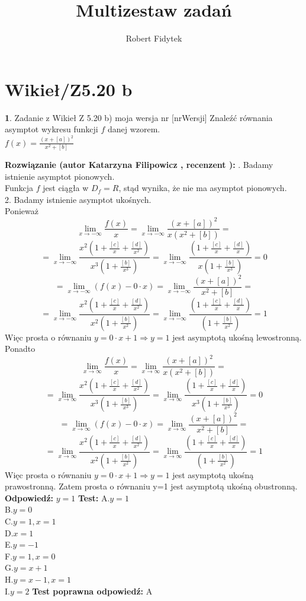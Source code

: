 \documentclass[12pt, a4paper]{article}
\title{Multizestaw zadań}
\author{Robert Fidytek}
\date{}
\theoremstyle{definition} %
\newtheorem{zad}{}
\newcommand{\kategoria}[1]{\section{#1}} %
\newcommand{\zadStart}[1]{\begin{zad}#1\newline} %
\newcommand{\zadStop}{\end{zad}}   %
\newcommand{\rozwStart}[2]{\noindent \textbf{Rozwiązanie (autor #1 , recenzent #2): }\newline} %
\newcommand{\rozwStop}{\newline}                                            %
\newcommand{\odpStart}{\noindent \textbf{Odpowiedź:}\newline}    %
\newcommand{\odpStop}{\newline}                                             %
\newcommand{\testStart}{\noindent \textbf{Test:}\newline} %
\newcommand{\testStop}{\newline} %
\newcommand{\kluczStart}{\noindent \textbf{Test poprawna odpowiedź:}\newline} %
\newcommand{\kluczStop}{\newline} %
\begin{document}
\maketitle


\kategoria{Wikieł/Z5.20 b}
\zadStart{Zadanie z Wikieł Z 5.20 b) moja wersja nr [nrWersji]}
Znaleźć równania asymptot wykresu funkcji $f$ danej wzorem.\\
 $f(x)=\frac{(x+[a])^2}{x^2+[b]}$
\zadStop
\rozwStart{Katarzyna Filipowicz}{}
1. Badamy istnienie asymptot pionowych.\\
Funkcja $f$ jest ciągła w $D_f=R$, stąd wynika, że nie ma asymptot pionowych.\\
2. Badamy istnienie asymptot ukośnych.\\
Ponieważ
$$ 
\lim_{x\rightarrow-\infty} \frac{f(x)}{x}=\lim_{x\rightarrow-\infty}\frac{(x+[a])^2}{x(x^2+[b])}=
$$ $$
=\lim_{x\rightarrow-\infty} \frac{x^2(1+\frac{[c]}{x}+\frac{[d]}{x^2})}{x^3(1+\frac{[b]}{x^3})}=\lim_{x\rightarrow-\infty} \frac{(1+\frac{[c]}{x}+\frac{[d]}{x})}{x(1+\frac{[b]}{x^3})}=0
$$ $$
=\lim_{x\rightarrow-\infty}(f(x)-0\cdot x)=\lim_{x\rightarrow-\infty}\frac{(x+[a])^2}{x^2+[b]}=
$$ $$
=\lim_{x\rightarrow-\infty} \frac{x^2(1+\frac{[c]}{x}+\frac{[d]}{x^2})}{x^2(1+\frac{[b]}{x^2})}=\lim_{x\rightarrow-\infty} \frac{(1+\frac{[c]}{x}+\frac{[d]}{x})}{(1+\frac{[b]}{x^2})}=1
$$
Więc prosta o równaniu $y=0\cdot x+1 \Rightarrow y=1$ jest asymptotą ukośną lewostronną.
Ponadto
$$ 
\lim_{x\rightarrow\infty} \frac{f(x)}{x}=\lim_{x\rightarrow\infty}\frac{(x+[a])^2}{x(x^2+[b])}=
$$ $$
=\lim_{x\rightarrow\infty} \frac{x^2(1+\frac{[c]}{x}+\frac{[d]}{x^2})}{x^3(1+\frac{[b]}{x^3})}=\lim_{x\rightarrow\infty} \frac{(1+\frac{[c]}{x}+\frac{[d]}{x})}{x^3(1+\frac{[b]}{x^3})}=0
$$ $$
=\lim_{x\rightarrow\infty}(f(x)-0\cdot x)=\lim_{x\rightarrow\infty}\frac{(x+[a])^2}{x^2+[b]}=
$$ $$
=\lim_{x\rightarrow\infty} \frac{x^2(1+\frac{[c]}{x}+\frac{[d]}{x^2})}{x^2(1+\frac{[b]}{x^2})}=\lim_{x\rightarrow\infty} \frac{(1+\frac{[c]}{x}+\frac{[d]}{x})}{(1+\frac{[b]}{x^2})}=1
$$
Więc prosta o równaniu $y=0\cdot x+1 \Rightarrow y=1$ jest asymptotą ukośną prawostronną.
Zatem  prosta o równaniu y=1 jest asymptotą ukośną obustronną.
\rozwStop
\odpStart
$y=1$
\odpStop
\testStart
A.$y=1$\\
B.$y=0$\\
C.$y=1,x=1$\\
D.$x=1$\\
E.$y=-1$\\
F.$y=1,x=0$\\
G.$y=x+1$\\
H.$y=x-1,x=1$\\
I.$y=2$
\testStop
\kluczStart
A
\kluczStop
\end{document}
